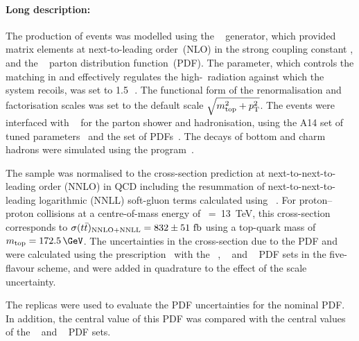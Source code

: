 


\paragraph{Long description:}

The production of \ttbar events was modelled using the
\POWHEGBOX[v2]~\cite{Frixione:2007nw,Nason:2004rx,Frixione:2007vw,Alioli:2010xd}
generator, which provided matrix elements at next-to-leading
order~(NLO) in the strong coupling constant \alphas, and the
\NNPDF[3.0nlo]~\cite{Ball:2014uwa} parton distribution function~(PDF). 
The \hdamp parameter, which controls the matching in \POWHEG and
effectively regulates the high-\pt\ radiation against which the
\ttbar system recoils, was set to 1.5\,\mtop~\cite{ATL-PHYS-PUB-2016-020}.
The functional form of the renormalisation and factorisation scales was
set to the default scale $\sqrt{m_{\textrm{top}}^2 + p_{\textrm T}^2}$.
The events were interfaced with
\PYTHIA[8.230]~\cite{Sjostrand:2014zea} for the parton shower and
hadronisation, using the A14 set of tuned
parameters~\cite{ATL-PHYS-PUB-2014-021} and the \NNPDF[2.3lo]
set of PDFs~\cite{Ball:2012cx}.
The decays of bottom and charm hadrons were simulated using the
\EVTGEN[1.6.0] program~\cite{Lange:2001uf}.

The \ttbar sample was normalised to the cross-section prediction at next-to-next-to-leading order (NNLO)
in QCD including the resummation of next-to-next-to-leading logarithmic (NNLL) soft-gluon terms calculated using
\TOPpp[2.0]~\cite{Beneke:2011mq,Cacciari:2011hy,Baernreuther:2012ws,Czakon:2012zr,Czakon:2012pz,Czakon:2013goa,Czakon:2011xx}.
For proton--proton collisions at a centre-of-mass energy of \rts~=~\SI{13}{\TeV}, this cross-section corresponds to
$\sigma(t\bar{t})_{\textrm{NNLO+NNLL}} = \mathrm{832\pm51~fb}$ using a top-quark mass of $\mtop = 172.5\,\GeV$.
The uncertainties in the cross-section due to the PDF and \alphas were calculated using the \PDFforLHC[15] prescription~\cite{Butterworth:2015oua}
with the \MSTW[nnlo]~\cite{Martin:2009iq,Martin:2009bu}, \CT[10nnlo]~\cite{Lai:2010vv,Gao:2013xoa} 
and \NNPDF[2.3lo]~\cite{Ball:2012cx} PDF sets in the five-flavour scheme, and were added in quadrature to the effect of the scale uncertainty.



The \NNPDF[3.0lo] replicas were used to evaluate the PDF uncertainties for the nominal PDF.
In addition, the central value of this PDF was compared with the central values of the 
\CT[14nnlo]~\cite{Dulat:2015mca} and \MMHT[nnlo]~\cite{Harland-Lang:2014zoa} PDF sets.


